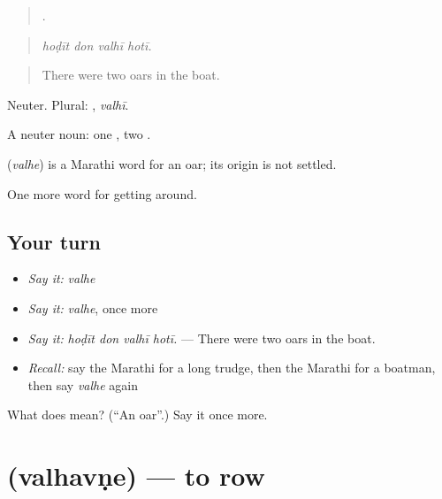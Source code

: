 \begin{quote}
   .
\end{quote}

\begin{quote}
\emph{hoḍīt don valhī hotī.}
\end{quote}

\begin{quote}
There were two oars in the boat.
\end{quote}

Neuter. Plural: , \emph{valhī}.

A neuter noun: one , two .

\begin{cousinweb}
\textbf{} (\emph{valhe}) is a Marathi word for an oar; its origin is not settled.
\end{cousinweb}

\begin{grammarlens}[title={What you've built}]
One more word for getting around.
\end{grammarlens}

\subsection*{Your turn}
\begin{itemize}
\raggedright
  \item \emph{Say it:} \emph{valhe}
  \item \emph{Say it:} \emph{valhe}, once more
  \item \emph{Say it:} \emph{hoḍīt don valhī hotī.} — There were two oars in the boat.
  \item \emph{Recall:} say the Marathi for a long trudge, then the Marathi for a boatman, then say \emph{valhe} again
\end{itemize}

\begin{tcolorbox}[breakable,colback=teal!4,colframe=teal!35!black,title={Before you move on}]
What does  mean? (\textquotedblleft{}An oar\textquotedblright{}.) Say it once more.
\end{tcolorbox}
\section[\texorpdfstring{\mr{वल्हवणे} (valhavṇe)}{वल्हवणे (valhavṇe)}]{ (valhavṇe) — to row}

\label{lesson:MR-C408-valhavne}



